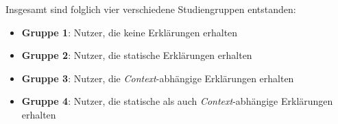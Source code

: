Insgesamt sind folglich vier verschiedene Studiengruppen entstanden:

\begin{itemize}
    \item \textbf{Gruppe 1}: Nutzer, die keine Erklärungen erhalten
    \item \textbf{Gruppe 2}: Nutzer, die statische Erklärungen erhalten
    \item \textbf{Gruppe 3}: Nutzer, die \textit{Context}-abhängige Erklärungen erhalten
    \item \textbf{Gruppe 4}: Nutzer, die statische als auch \textit{Context}-abhängige Erklärungen erhalten
\end{itemize}